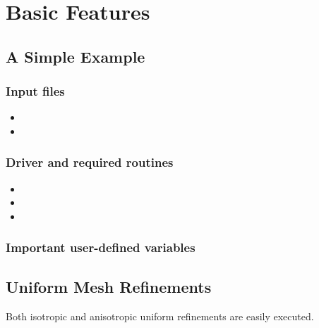 %
%

\chapter{Basic Features}
\label{chap:basics}


\section{A Simple Example}

\subsection{Input files}

\begin{itemize}
	\item {}
	\item {}
\end{itemize}

\subsection{Driver and required routines}

\begin{itemize}
	\item {}
	\item {}
	\item {}
\end{itemize}

\subsection{Important user-defined variables}

\section{Uniform Mesh Refinements}

Both isotropic and anisotropic uniform refinements are easily executed.

%


